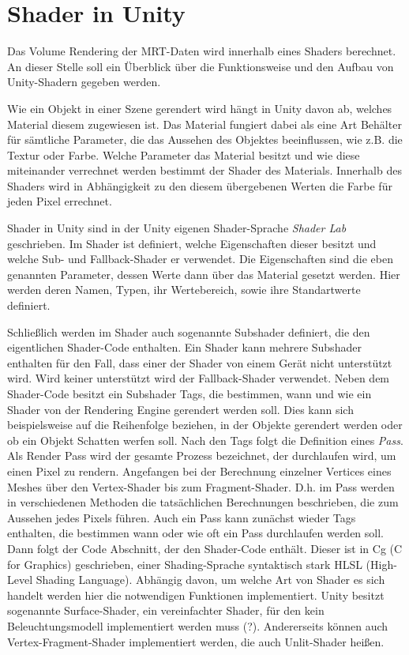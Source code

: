 \section{Shader in Unity}

Das Volume Rendering der MRT-Daten wird innerhalb eines Shaders berechnet. An dieser Stelle soll ein Überblick über die Funktionsweise und den Aufbau von Unity-Shadern gegeben werden. 

Wie ein Objekt in einer Szene gerendert wird hängt in Unity davon ab, welches Material diesem zugewiesen ist. Das Material fungiert dabei als eine Art Behälter für sämtliche Parameter, die das Aussehen des Objektes beeinflussen, wie z.B. die Textur oder Farbe. Welche Parameter das Material besitzt und wie diese miteinander verrechnet werden bestimmt der Shader des Materials. Innerhalb des Shaders wird in Abhängigkeit zu den diesem übergebenen Werten die Farbe für jeden Pixel errechnet. 

Shader in Unity sind in der Unity eigenen Shader-Sprache \textit{Shader Lab} geschrieben. Im Shader ist definiert, welche Eigenschaften dieser besitzt und welche Sub- und Fallback-Shader er verwendet.
Die Eigenschaften sind die eben genannten Parameter, dessen Werte dann über das Material gesetzt werden. Hier werden deren Namen, Typen, ihr Wertebereich, sowie ihre Standartwerte definiert. 

Schließlich werden im Shader auch sogenannte Subshader definiert, die den eigentlichen Shader-Code enthalten.
Ein Shader kann mehrere Subshader enthalten für den Fall, dass einer der Shader von einem Gerät nicht unterstützt wird. Wird keiner unterstützt wird der Fallback-Shader verwendet. 
Neben dem Shader-Code besitzt ein Subshader Tags, die bestimmen, wann und wie ein Shader von der Rendering Engine gerendert werden soll. Dies kann sich beispielsweise auf die Reihenfolge beziehen, in der Objekte gerendert werden oder ob ein Objekt Schatten werfen soll. 
Nach den Tags folgt die Definition eines \textit{Pass}. Als Render Pass wird der gesamte Prozess bezeichnet, der durchlaufen wird, um einen Pixel zu rendern. Angefangen bei der Berechnung einzelner Vertices eines Meshes über den Vertex-Shader bis zum Fragment-Shader. D.h. im Pass werden in verschiedenen Methoden die tatsächlichen Berechnungen beschrieben, die zum Aussehen jedes Pixels führen. 
Auch ein Pass kann zunächst wieder Tags enthalten, die bestimmen wann oder wie oft ein Pass durchlaufen werden soll. 
Dann folgt der Code Abschnitt, der den Shader-Code enthält. Dieser ist in Cg (C for Graphics) geschrieben, einer Shading-Sprache syntaktisch stark HLSL (High-Level Shading Language). 
Abhängig davon, um welche Art von Shader es sich handelt werden hier die notwendigen Funktionen implementiert. Unity besitzt sogenannte Surface-Shader, ein vereinfachter Shader, für den kein Beleuchtungsmodell implementiert werden muss (?). Andererseits können auch Vertex-Fragment-Shader implementiert werden, die auch Unlit-Shader heißen. 


